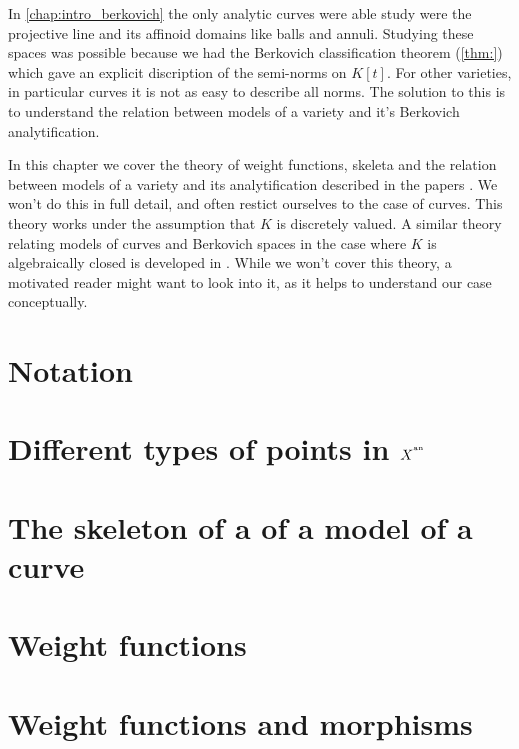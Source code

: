 In \cref{chap:intro_berkovich} the only analytic curves were able study were the projective line and its affinoid domains like balls and annuli.
Studying these spaces was possible because we had the Berkovich classification  theorem (\cref{thm:}) which gave an explicit discription of the semi-norms on $K[t]$. 
For other varieties, in particular curves it is not as easy to describe all norms.
The solution to this is to understand the relation between models of a variety and it's Berkovich analytification. 


In this chapter we cover the theory of weight functions, skeleta and the relation between models of a variety and its analytification described in the papers \cite{mustataWeightFunctionsNonArchimedean2015, nicaiseBerkovichSkeletaBirational2016, bakerWeightFunctionsBerkovich2016}.
We won't do this in full detail, and often restict ourselves to the case of curves.
This theory works under the assumption that $K$ is discretely valued. 
A similar theory relating models of curves and Berkovich spaces in the case where $K$ is algebraically closed is developed in \cite{bakerStructureNonarchimedeanAnalytic2013}. 
While we won't cover this theory, a motivated reader might want to look into it, as it helps to understand our case conceptually. 



\section{Notation} \label{sec:notation}


\section{Different types of points in $X^{{}^{\text{an}}}$} \label{sec:different_types_of_points_in_xan}


\section{The skeleton of a of a model of a curve} \label{sec:the_dual_graph_of_a_model_of_a_curve}



\section{Weight functions} \label{sec:weight_functions}

\section{Weight functions and morphisms} \label{sec:weight_functions_and_morphisms}


